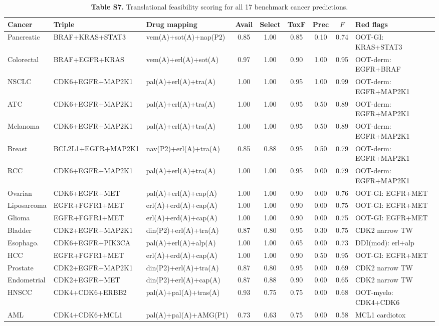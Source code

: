 \documentclass[11pt]{article}
\begin{document}
\begin{table}[htbp]
\centering
\caption{\textbf{Table S7.} Translational feasibility scoring for all 17 benchmark cancer predictions.}
\label{tab:s7_feasibility_supp}
\scriptsize
\setlength{\tabcolsep}{3pt}
\begin{tabular}{@{}p{2cm}p{2.5cm}p{2.6cm}cccccp{3.3cm}@{}}
\toprule
\textbf{Cancer} & \textbf{Triple} & \textbf{Drug mapping} & \textbf{Avail} & \textbf{Select} & \textbf{ToxF} & \textbf{Prec} & $F$ & \textbf{Red flags} \\
\midrule
Pancreatic & BRAF+KRAS+STAT3 & vem(A)+sot(A)+nap(P2) & 0.85 & 1.00 & 0.85 & 0.10 & 0.74 & OOT-GI: KRAS+STAT3 \\
Colorectal & BRAF+EGFR+KRAS & vem(A)+erl(A)+sot(A) & 0.97 & 1.00 & 0.90 & 1.00 & 0.95 & OOT-derm: EGFR+BRAF \\
NSCLC & CDK6+EGFR+MAP2K1 & pal(A)+erl(A)+tra(A) & 1.00 & 1.00 & 0.95 & 1.00 & 0.99 & OOT-derm: EGFR+MAP2K1 \\
ATC & CDK6+EGFR+MAP2K1 & pal(A)+erl(A)+tra(A) & 1.00 & 1.00 & 0.95 & 0.50 & 0.89 & OOT-derm: EGFR+MAP2K1 \\
Melanoma & CDK6+EGFR+MAP2K1 & pal(A)+erl(A)+tra(A) & 1.00 & 1.00 & 0.95 & 0.50 & 0.89 & OOT-derm: EGFR+MAP2K1 \\
Breast & BCL2L1+EGFR+MAP2K1 & nav(P2)+erl(A)+tra(A) & 0.85 & 0.88 & 0.95 & 0.50 & 0.79 & OOT-derm: EGFR+MAP2K1 \\
RCC & CDK6+EGFR+MAP2K1 & pal(A)+erl(A)+tra(A) & 1.00 & 1.00 & 0.95 & 0.00 & 0.79 & OOT-derm: EGFR+MAP2K1 \\
Ovarian & CDK6+EGFR+MET & pal(A)+erl(A)+cap(A) & 1.00 & 1.00 & 0.90 & 0.00 & 0.76 & OOT-GI: EGFR+MET \\
Liposarcoma & EGFR+FGFR1+MET & erl(A)+erd(A)+cap(A) & 1.00 & 1.00 & 0.90 & 0.00 & 0.75 & OOT-GI: EGFR+MET \\
Glioma & EGFR+FGFR1+MET & erl(A)+erd(A)+cap(A) & 1.00 & 1.00 & 0.90 & 0.00 & 0.75 & OOT-GI: EGFR+MET \\
Bladder & CDK2+EGFR+MAP2K1 & din(P2)+erl(A)+tra(A) & 0.87 & 0.80 & 0.95 & 0.30 & 0.75 & CDK2 narrow TW \\
Esophago. & CDK6+EGFR+PIK3CA & pal(A)+erl(A)+alp(A) & 1.00 & 1.00 & 0.65 & 0.00 & 0.73 & DDI(mod): erl+alp \\
HCC & EGFR+FGFR1+MET & erl(A)+erd(A)+cap(A) & 1.00 & 1.00 & 0.90 & 0.50 & 0.95 & OOT-GI: EGFR+MET \\
Prostate & CDK2+EGFR+MAP2K1 & din(P2)+erl(A)+tra(A) & 0.87 & 0.80 & 0.95 & 0.00 & 0.69 & CDK2 narrow TW \\
Endometrial & CDK2+EGFR+MET & din(P2)+erl(A)+cap(A) & 0.87 & 0.88 & 0.90 & 0.00 & 0.65 & CDK2 narrow TW \\
HNSCC & CDK4+CDK6+ERBB2 & pal(A)+pal(A)+tras(A) & 0.93 & 0.75 & 0.75 & 0.00 & 0.68 & OOT-myelo: CDK4+CDK6 \\
AML & CDK4+CDK6+MCL1 & pal(A)+pal(A)+AMG(P1) & 0.73 & 0.63 & 0.75 & 0.00 & 0.58 & MCL1 cardiotox \\
\bottomrule
\end{tabular}
\normalsize
\end{table}
\end{document}
